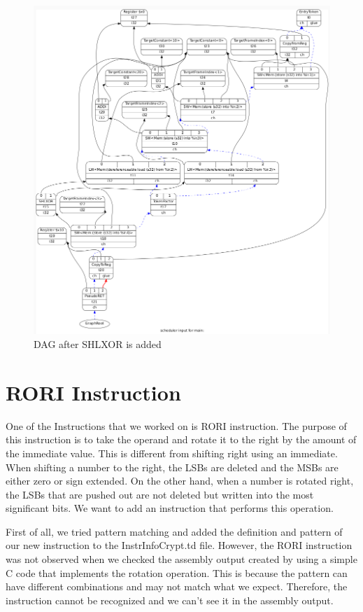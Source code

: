 \begin{figure}[h!]
    \centering
    \includegraphics[scale= 0.3]{adding_new_instr/shlxor_after.png}
    \caption{DAG after SHLXOR is added}
    \label{fig:shlxor_after}
\end{figure}

\section{RORI Instruction}\label{sec:rori}
One of the Instructions that we worked on is RORI instruction. The purpose of this instruction is to take the operand and rotate it to the right by the amount of the immediate value. This is different from shifting right using an immediate. When shifting a number to the right, the LSBs are deleted and the MSBs are either zero or sign extended. On the other hand, when a number is rotated right, the LSBs that are pushed out are not deleted but written into the most significant bits. We want to add an instruction that performs this operation.

First of all, we tried pattern matching and added the definition and pattern of our new instruction to the InstrInfoCrypt.td file. However, the RORI instruction was not observed when we checked the assembly output created by using a simple C code that implements the rotation operation. This is because the pattern can have different combinations and may not match what we expect. Therefore, the instruction cannot be recognized and we can’t see it in the assembly output.

